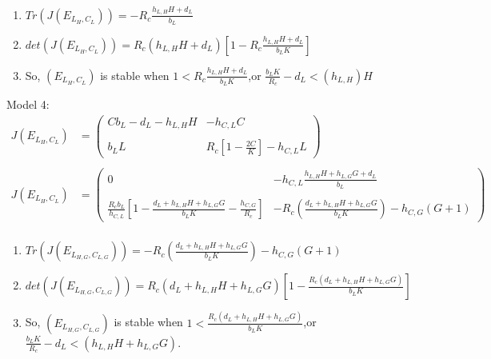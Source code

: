 \documentclass[11pt]{article}
\begin{document}
{\begin{enumerate}
\item $Tr(J(E_{L_{H}, C_{L}})  ) = -R_{c}\frac{h_{L,H}H +d_{L}}{b_{L}}$\\

\item$det(J(E_{L_{H}, C_{L}})  ) =  R_{c}(h_{L,H}H +d_{L}) \left[ 1 -R_{c}\frac{h_{L,H}H +d_{L}}{b_{L}K}\right] $\\

\item So, $(E_{L_{H}, C_{L}} )$ is stable when $1  < R_{c}\frac{h_{L,H}H +d_{L}}{b_{L}K}$,or  $\frac{b_{L}K}{R_{c}} -d_{L}< (h_{L,H})H  $\\
\end{enumerate}
\vspace{.5in}




Model 4: 
\begin{align*}
J(E_{L_{H}, C_{L}}  )& = \begin{pmatrix} Cb_{L} - d_{L} - h_{L,H}H & - h_{C,L} C\\
						 & \\
						b_{L}L & R_{c}\left[1 - \frac{2C}{K} \right] - h_{C,L}L  \end{pmatrix}\\
\\
J(E_{L_{H}, C_{L}}  ) &= \begin{pmatrix} 0 & - h_{C,L} \frac{h_{L,H}H + h_{L,G}G + d_{L}}{b_{L}}\\
						 & \\
						\frac{R_{c}b_{L}}{h_{C,L}}\left[ 1 - \frac{d_{L} + h_{L,H}H + h_{L,G}G}{b_{L}K} - \frac{h_{C,G}}{R_{c}}\right]& -R_{c} \left( \frac{d_{L} + h_{L,H}H + h_{L,G}G}{b_{L}K} \right) - h_{C,G}(G+1)  \end{pmatrix}\\
\end{align*}

\begin{enumerate}
\item $Tr(J(E_{L_{H,G}, C_{L,G}})  ) =  -R_{c} \left( \frac{d_{L} + h_{L,H}H + h_{L,G}G}{b_{L}K} \right) - h_{C,G}(G+1) $\\

\item$det(J(E_{L_{H,G}, C_{L,G}})  ) =   R_{c}(d_{L} + h_{L,H}H + h_{L,G}G) \left[ 1 - \frac{R_{c}(d_{L} + h_{L,H}H + h_{L,G}G)}{b_{L}K}\right] $\\

\item So, $(E_{L_{H,G}, C_{L,G}} )$ is stable when $1 <  \frac{R_{c}(d_{L} + h_{L,H}H + h_{L,G}G)}{b_{L}K}$,or  $\frac{b_{L}K}{R_{c}}- d_{L} < (h_{L,H}H + h_{L,G}G)$.\\
\end{enumerate}









}
\end{document}
